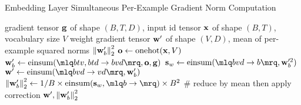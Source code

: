 \begin{algorithm}
\caption{Embedding Layer Simultaneous Per-Example Gradient Norm Computation}
\label{alg:embedding-layer}
\begin{algorithmic}[1]
\Require gradient tensor $\mathbf{g}$ of shape $(B, T, D)$, input id tensor $\mathbf{x}$ of shape $(B, T)$, vocabulary size $V$
\Ensure weight gradient tensor $\mathbf{w}'$ of shape $(V, D)$, mean of per-example squared norms $\left\lVert\mathbf{w}_b'\right\rVert_2^2$
\State $\mathbf{o} \gets \text{onehot}(\mathbf{x}, V)$
\State $\wB_b' \gets \text{einsum}(\mlq b t v,b t d \rightarrow b v d \mrq, \oB, \gB)$
\State $\mathbf{s}_{w} \gets \text{einsum}(\mlq b v d \rightarrow b \mrq, \wB_b'^2)$
\State $\wB' \gets \text{einsum}(\mlq b v d \rightarrow v d \mrq, \wB_b')$
\State $\sqn{\wB_b'} \gets 1/B \times \text{einsum}(\mathbf{s}_w, \mlq b \rightarrow \mrq) \times B^2$ \# reduce by mean then apply correction
\State \Return $\mathbf{w}', \left\lVert\mathbf{w}_b'\right\rVert_2^2$
\end{algorithmic}
\end{algorithm}
